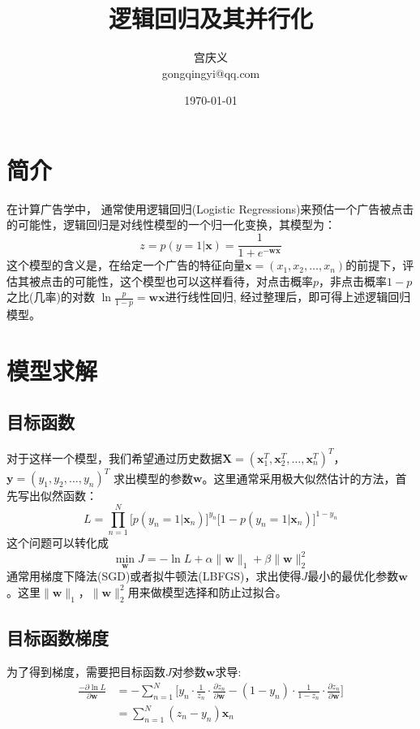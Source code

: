 \documentclass[UTF8,10pt, twoside]{article}
\title{逻辑回归及其并行化}
\author{宫庆义\\gongqingyi@qq.com}
\date{\today}
\begin{document}
 
 	\pagestyle{empty}
 	\maketitle                         %
 	\thispagestyle{empty}
 	\newpage
   
\section{简介}
在计算广告学中， 通常使用逻辑回归(Logistic Regressions)来预估一个广告被点击的可能性，逻辑回归是对线性模型的一个归一化变换，其模型为：
\begin{equation}
z = p(y = 1|\bm{x}) = \frac{1}{1+e^{-\bm{w}\bm{x}}}
\end{equation}
这个模型的含义是，在给定一个广告的特征向量\(\bm{x}=(x_1,x_2,\ldots,x_n)\)的前提下，评估其被点击的可能性，这个模型也可以这样看待，对点击概率\(p\)，非点击概率\(1-p\)之比(几率)的对数 \(\ln\frac{p}{1-p} = \bm{w}\bm{x} \)进行线性回归,  经过整理后，即可得上述逻辑回归模型。


\section{模型求解}
\subsection{目标函数}
对于这样一个模型，我们希望通过历史数据\(\bm{X}=(\bm{x}_1^T, \bm{x}_2^T, \ldots, \bm{x}_n^T)^T \)，\(\bm{y}=(y_1, y_2, \ldots, y_n)^T\) 求出模型的参数\(\bm{w}\)。这里通常采用极大似然估计的方法，首先写出似然函数：
\begin{equation}
L=\prod_{n=1}^{N}\Big[p(y_n=1|\bm{x}_n)\Big]^{y_n}\Big[1-p(y_n=1|\bm{x}_n)\Big]^{1-y_n}
\end{equation}
这个问题可以转化成
\begin{equation}
 \min\limits_{\bm{w}} J = -\ln L + \alpha \|\bm{w}\|_1 + \beta \|\bm{w}\|_2^2
\end{equation}
 通常用梯度下降法(SGD)或者拟牛顿法(LBFGS)，求出使得\(J\)最小的最优化参数\(\bm{w}\)。这里\(\|\bm{w}\|_1\)，\(\|\bm{w}\|_2^2\)用来做模型选择和防止过拟合。
 
\subsection{目标函数梯度}
为了得到梯度，需要把目标函数\(J\)对参数\(\bm{w}\)求导:
\begin{equation}
\begin{aligned} 
\frac{-\partial \ln L}{\partial \bm{w}} &= -\sum_{n=1}^{N}\Big[  y_n \cdot \frac{1}{z_n} \cdot \frac{\partial z_n}{\partial \bm{w}}  -  (1-y_n) \cdot \frac{1}{1-z_n}\cdot \frac{\partial z_n}{\partial \bm{w}}  \Big]\\
&=\sum_{n=1}^N(z_n-y_n)\bm{x}_n
\end{aligned} 
\end{equation}
\end{document}
